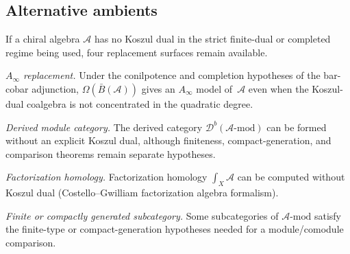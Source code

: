 \subsection{Alternative ambients}

\begin{remark}\label{rem:no-dual-alternatives}
If a chiral algebra $\mathcal{A}$ has no Koszul dual in the strict
finite-dual or completed regime being used, four replacement surfaces
remain available.

\emph{$A_\infty$ replacement.}
Under the conilpotence and completion hypotheses of the bar-cobar
adjunction, $\Omega(\bar{B}(\mathcal{A}))$ gives an $A_\infty$
model of~$\mathcal{A}$ even when the Koszul-dual coalgebra is not
concentrated in the quadratic degree.

\emph{Derived module category.}
The derived category $\mathcal{D}^b(\mathcal{A}\text{-mod})$ can be
formed without an explicit Koszul dual, although finiteness,
compact-generation, and comparison theorems remain separate
hypotheses.

\emph{Factorization homology.}
Factorization homology $\int_X \mathcal{A}$ can be computed without Koszul dual
(Costello--Gwilliam factorization algebra formalism).

\emph{Finite or compactly generated subcategory.}
Some subcategories of $\mathcal{A}\text{-mod}$ satisfy the
finite-type or compact-generation hypotheses needed for a
module/comodule comparison.
\end{remark}
